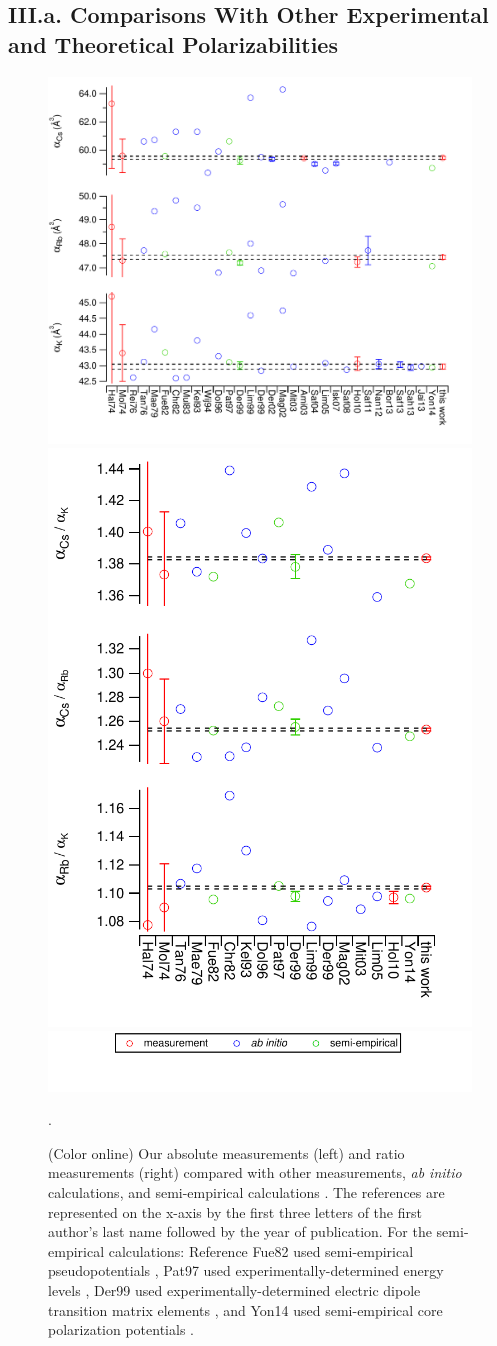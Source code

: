 \documentclass[twocolumn,prl,showpacs,superscriptaddress]{revtex4-1}   %
\begin{document}
\subsection{III.a. Comparisons With Other Experimental and Theoretical Polarizabilities}

\begin{figure}
\includegraphics[width=0.60\linewidth,keepaspectratio]{displayAbsComps.pdf}
\includegraphics[width=0.38\linewidth,keepaspectratio]{displayRatComps.pdf}
\includegraphics[width=0.55\linewidth,keepaspectratio]{displayCompsLegend.pdf}
\caption{\label{comparisons}(Color online) Our absolute measurements (left) and ratio measurements (right) compared with other measurements, \textit{ab initio} calculations, and semi-empirical calculations 
\cite{Molof1974a,Hall1974,Tang1976,Reinsch1976,Kutzelnigg1978,
Christiansen1982,Fuentealba1999,Muller1984,Kello1993,VanWijngaarden1994,
Dolg1996,Patil1997,Derevianko1998,Magnier2002,Derevianko2001,
Amini2003,Mitroy2003,Safronova2004,Lim2005,Safronova2008,
Holmgren2010,Safronova2011,Nandy2012,Jiang2013,Sahoo2013,
Safronova2013,Borschevsky2013,Y.-B.2014}.
The references are represented on the x-axis by the first three letters of the first author's last name followed by the year of publication. For the semi-empirical calculations: Reference Fue82 used semi-empirical pseudopotentials \cite{Fuentealba1999}, Pat97 used experimentally-determined energy levels \cite{Patil1997}, Der99 used experimentally-determined electric dipole transition matrix elements \cite{Derevianko1998}, and Yon14 used semi-empirical core polarization potentials \cite{Y.-B.2014}.}.
\end{figure}
\end{document}

